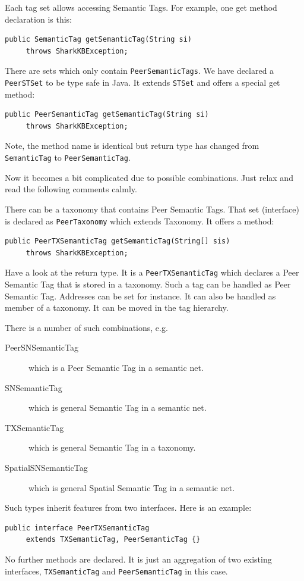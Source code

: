 Each tag set allows accessing Semantic Tags. For example, one get method declaration is this:

\begin{verbatim}
public SemanticTag getSemanticTag(String si) 
     throws SharkKBException;
\end{verbatim}

There are sets which only contain {\tt PeerSemanticTags}. We have declared a {\tt PeerSTSet} to be type safe in Java. It extends {\tt STSet} and offers a special get method:

\begin{verbatim}
public PeerSemanticTag getSemanticTag(String si) 
     throws SharkKBException;
\end{verbatim}

Note, the method name is identical but return type has changed from {\tt SemanticTag} to {\tt PeerSemanticTag}.

Now it becomes a bit complicated due to possible combinations. Just relax and read the following comments calmly. 

There can be a taxonomy that contains Peer Semantic Tags. That set (interface) is declared as {\tt PeerTaxonomy} which extends Taxonomy. It offers a method:

\begin{verbatim}
public PeerTXSemanticTag getSemanticTag(String[] sis) 
     throws SharkKBException;
\end{verbatim}

Have a look at the return type. It is a {\tt PeerTXSemanticTag} which declares a Peer Semantic Tag that is stored in a taxonomy. Such a tag can be handled as Peer Semantic Tag. Addresses can be set for instance. It can also be handled as member of a taxonomy. It can be moved in the tag hierarchy.

There is a number of such combinations, e.g.

\begin{description}
\item[PeerSNSemanticTag] which is a Peer Semantic Tag in a semantic net.
\item[SNSemanticTag] which is general Semantic Tag in a semantic net.
\item[TXSemanticTag] which is general Semantic Tag in a taxonomy.
\item[SpatialSNSemanticTag] which is general Spatial Semantic Tag in a semantic net.
\end{description}

Such types inherit features from two interfaces. Here is an example:
\begin{verbatim}
public interface PeerTXSemanticTag 
     extends TXSemanticTag, PeerSemanticTag {}
\end{verbatim}
No further methods are declared. It is just an aggregation of two existing interfaces, {\tt TXSemanticTag} and {\tt PeerSemanticTag} in this case.


